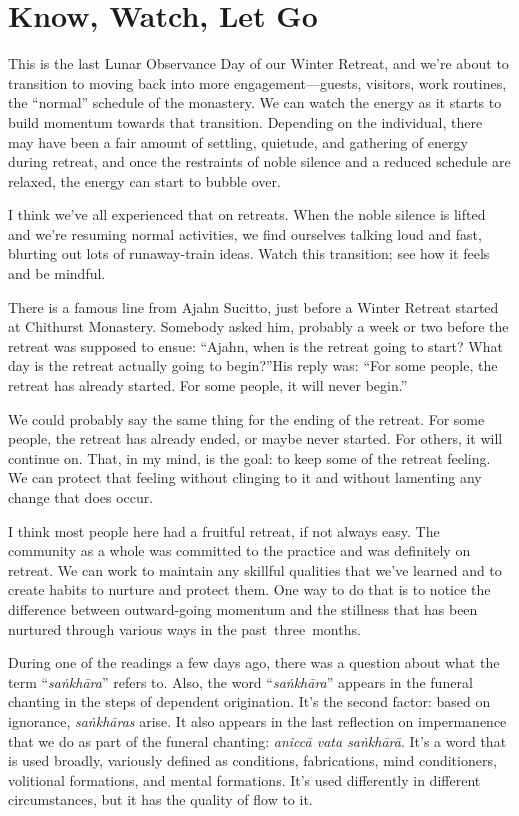 
\chapter{Know, Watch, Let Go}


This is the last Lunar Observance Day of our Winter Retreat, and we're about to transition to moving back into more engagement---guests, visitors, work routines, the ``normal'' schedule of the monastery. We can watch the energy as it starts to build momentum towards that transition. Depending on the individual, there may have been a fair amount of settling, quietude, and gathering of energy during retreat, and once the restraints of noble silence and a reduced schedule are relaxed, the energy can start to bubble over.

I think we've all experienced that on retreats. When the noble silence is lifted and we're resuming normal activities, we find ourselves talking loud and fast, blurting out lots of runaway-train ideas. Watch this transition; see how it feels and be mindful.

There is a famous line from Ajahn Sucitto, just before a Winter Retreat started at Chithurst Monastery. Somebody asked him, probably a week or two before the retreat was supposed to ensue: ``Ajahn, when is the retreat going to start? What day is the retreat actually going to begin?''His reply was: ``For some people, the retreat has already started. For some people, it will never begin.''

We could probably say the same thing for the ending of the retreat. For some people, the retreat has already ended, or maybe never started. For others, it will continue on. That, in my mind, is the goal: to keep some of the retreat feeling. We can protect that feeling without clinging to it and without lamenting any change that does occur.

I think most people here had a fruitful retreat, if not always easy. The community as a whole was committed to the practice and was definitely on retreat. We can work to maintain any skillful qualities that we've learned and to create habits to nurture and protect them. One way to do that is to notice the difference between outward-going momentum and the stillness that has been nurtured through various ways in the \mbox{past three months.}

\enlargethispage{-1\baselineskip}
During one of the readings a few days ago, there was a question about what the term ``\emph{saṅkhāra}'' refers to. Also, the word ``\emph{saṅkhāra}'' appears in the funeral chanting in the steps of dependent origination. It's the second factor: based on ignorance, \emph{saṅkhāras} arise. It also appears in the last reflection on impermanence that we do as part of the funeral chanting: \emph{aniccā vata saṅkhārā}. It's a word that is used broadly, variously defined as conditions, fabrications, mind conditioners, volitional formations, and mental formations. It's used differently in different circumstances, but it has the quality of flow to it.

